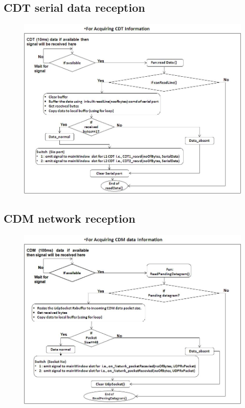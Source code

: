 \subsection{CDT serial data reception}
\begin{figure}[H]
	\centering
	\includegraphics[width=\linewidth]{./FlowCharts/PngFlowCharts/SG2_CDT.png}
\end{figure}
\subsection{CDM network reception}
\begin{figure}[H]
	\centering
	\includegraphics[width=\linewidth]{./FlowCharts/PngFlowCharts/SG3_CDM.png}
\end{figure}
